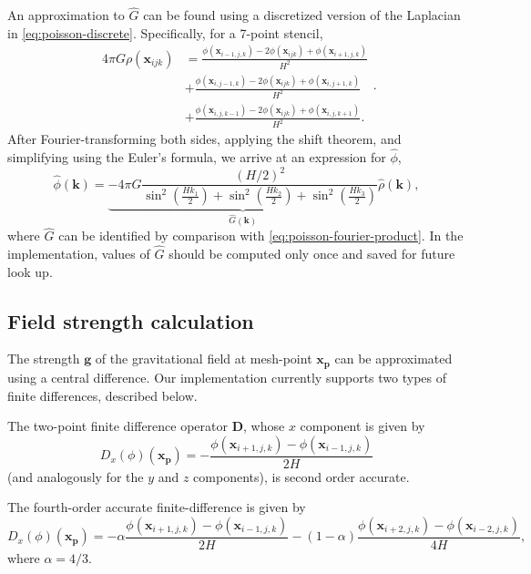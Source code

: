 An approximation to $\hat{G}$ can be found using a discretized version of the Laplacian in \autoref{eq:poisson-discrete}.
Specifically, for a 7-point stencil,
\begin{equation*}
    \begin{split}
        4\pi G\rho(\mathbf{x}_{ijk})
         & =\frac{\phi(\mathbf{x}_{i-1,j,k}) - 2\phi(\mathbf{x}_{ijk})+\phi(\mathbf{x}_{i+1,j,k})}{H^2}   \\
         & + \frac{\phi(\mathbf{x}_{i,j-1,k}) - 2\phi(\mathbf{x}_{ijk})+\phi(\mathbf{x}_{i,j+1,k})}{H^2}  \\
         & + \frac{\phi(\mathbf{x}_{i,j,k-1}) - 2\phi(\mathbf{x}_{ijk})+\phi(\mathbf{x}_{i,j,k+1})}{H^2}.
    \end{split}.
\end{equation*}
After Fourier-transforming both sides, applying the shift theorem, and simplifying using the Euler's formula, we arrive at an expression for $\hat{\phi}$,
\begin{equation*}
    \hat{\phi}(\mathbf{k}) = \underbrace{-4\pi G\frac{(H/2)^2}{\sin^2\left(\frac{Hk_1}{2}\right)+\sin^2\left(\frac{Hk_2}{2}\right)+\sin^2\left(\frac{Hk_3}{2}\right)}}_{\hat{G}(\mathbf{k})} \hat{\rho}(\mathbf{k}),
\end{equation*}
where $\hat{G}$ can be identified by comparison with \autoref{eq:poisson-fourier-product}.
In the implementation, values of $\hat{G}$ should be computed only once and saved for future look up.

\subsection{Field strength calculation}
The strength $\mathbf{g}$ of the gravitational field at mesh-point $\mathbf{x}_\mathbf{p}$ can be approximated using a central difference.
Our implementation currently supports two types of finite differences, described below.

The two-point finite difference operator $\mathbf{D}$, whose $x$ component is given by
\begin{equation}\label{eq:two-point-central-diff}
    D_x(\phi)(\mathbf{x_\mathbf{p}}) = - \frac{\phi(\mathbf{x}_{i+1,j,k}) - \phi(\mathbf{x}_{i-1,j,k})}{2H}
\end{equation}
(and analogously for the $y$ and $z$ components), is second order accurate.

The fourth-order accurate finite-difference is given by
\begin{equation}\label{eq:four-point-central-diff}
    D_x(\phi)(\mathbf{x}_\mathbf{p}) = -\alpha\frac{\phi(\mathbf{x}_{i+1,j,k}) - \phi(\mathbf{x}_{i-1,j,k})}{2H} - (1-\alpha)\frac{\phi(\mathbf{x}_{i+2,j,k}) - \phi(\mathbf{x}_{i-2,j,k})}{4H},
\end{equation}
where $\alpha = 4/3$.


